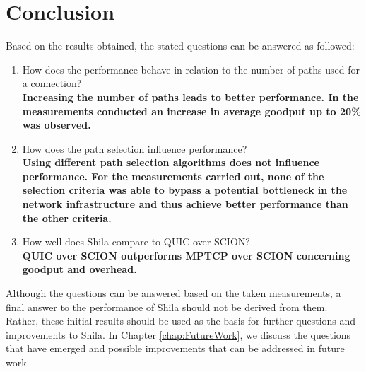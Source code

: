 \section{Conclusion}

Based on the results obtained, the stated questions can be answered as followed:

{\small \begin{enumerate}
	\item How does the performance behave in relation to the number of paths used for a connection? \smallskip\\ \textbf{Increasing the number of paths leads to better performance. In the measurements conducted an increase in average goodput up to 20\% was observed.}
	\item How does the path selection influence performance?
	\smallskip\\ \textbf{Using different path selection algorithms does not influence performance. For the measurements carried out, none of the selection criteria was able to bypass a potential bottleneck in the network infrastructure and thus achieve better performance than the other criteria.}
	\item How well does Shila compare to QUIC over SCION?
	\smallskip\\ \textbf{QUIC over SCION outperforms MPTCP over SCION concerning goodput and overhead.}
\end{enumerate}}

Although the questions can be answered based on the taken measurements, a final answer to the performance of Shila should not be derived from them. Rather, these initial results should be used as the basis for further questions and improvements to Shila. In Chapter \ref{chap:FutureWork}, we discuss the questions that have emerged and possible improvements that can be addressed in future work.  